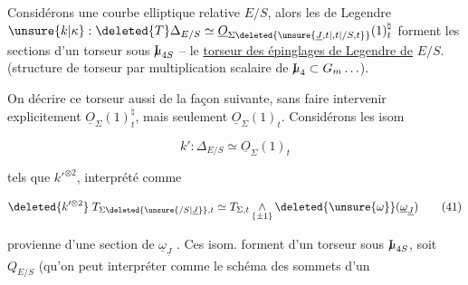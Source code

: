 Considérons une courbe elliptique relative $E/S$, alors les   de Legendre $\unsure{k|\kappa}:\deleted{T}\Delta_{E/S}\simeq\underline O_{\Sigma\deleted{\unsure{\underline J,t|,t|/S,t}}}(1)_t^{\natural}$ forment les sections d'un torseur sous $\mathord{\mathrm{I}\mkern-7mu\mu}_{4S}$ -- le \uline{torseur  des épinglages de Legendre de} $E/S$. (structure de torseur par multiplication scalaire de $\mathord{\mathrm{I}\mkern-7mu\mu}_4\subset G_m\ldots$).

On   décrire ce torseur aussi de la façon suivante, sans faire intervenir explicitement $\underline O_{\Sigma}(1)_t^\natural$, mais seulement $\underline O_{\Sigma}(1)_t$. Considérons les isom

\[
k':\Delta_{E/S}\simeq\underline O_{\Sigma}(1)_t
\tag*{(40)}
\]

tels que $k'^{\otimes2}$, interprété comme

\[
\deleted{k'^{\otimes2}}\;T_{\Sigma\deleted{\unsure{/S|\underline J}},t}\simeq T_{\Sigma,t}\mathop{\wedge}_{\{\pm1\}}\deleted{\unsure{\omega}}(\underline\omega_{\underline J})
\tag*{(41)}
\]

provienne d'une section de $\underline\omega_{\underline J}$ . Ces isom. forment   d'un torseur sous $\mathord{\mathrm{I}\mkern-7mu\mu}_{4S}$, soit $Q_{E/S}$ (qu'on peut interpréter comme le schéma des sommets d'un

